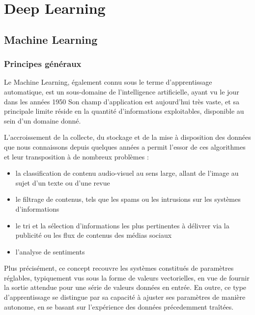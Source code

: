 \documentclass[a4paper,10pt]{report}
\title{}
\author{}
\begin{document}
\maketitle

\chapter{Deep Learning}

\section{Machine Learning}

\subsection{Principes généraux}

Le Machine Learning, également connu sous le terme d'apprentissage automatique, est un sous-domaine de l'intelligence artificielle, ayant vu le jour dans
les années 1950\cite{Bib_Marr}\cite{Bib_McCar}
Son champ d'application est aujourd'hui très vaste, et sa principale limite réside en la quantité d'informations exploitables, disponible au sein d'un domaine donné.


L'accroissement de la collecte, du stockage et de la mise à disposition des données que nous connaissons depuis quelques années a permit l'essor de ces algorithmes et leur transposition à de nombreux problèmes :

\begin{itemize}
  \item la classification de contenu audio-visuel au sens large, allant de l'image au sujet d'un texte ou d'une revue
  \item le filtrage de contenus, tels que les spams ou les intrusions sur les systèmes d'informations
  \item le tri et la sélection d'informations les plus pertinentes à délivrer via la publicité ou les flux de contenus des médias sociaux
  \item l'analyse de sentiments
\end{itemize}

Plus précisément, ce concept recouvre les systèmes constitués de paramètres réglables, typiquement vus sous la forme de
valeurs vectorielles, en vue de fournir la sortie attendue pour une série de valeurs données en entrée. En outre, ce type d'apprentissage se distingue
par sa capacité à ajuster ses paramètres de manière autonome, en se basant sur l'expérience des données précedemment traîtées.
\end{document}
